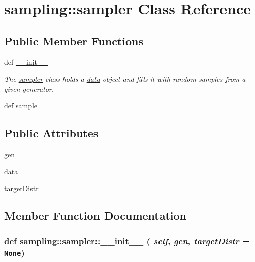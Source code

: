 \hypertarget{classsampling_1_1sampler}{
\section{sampling::sampler Class Reference}
\label{classsampling_1_1sampler}
}
\subsection*{Public Member Functions}
\begin{CompactItemize}
\item 
def \hyperlink{classsampling_1_1sampler_1f14a8e3d0700779dcdac79def1c33d3}{\_\-\_\-init\_\-\_\-}
\begin{CompactList}\small\item\em The \hyperlink{classsampling_1_1sampler}{sampler} class holds a \hyperlink{classsampling_1_1data}{data} object and fills it with random samples from a given generator. \item\end{CompactList}\item 
def \hyperlink{classsampling_1_1sampler_a3908666fdfd325eb00c171a267fe650}{sample}
\end{CompactItemize}
\subsection*{Public Attributes}
\begin{CompactItemize}
\item 
\hyperlink{classsampling_1_1sampler_96f11b07709c74778ddd41e8d7ea1439}{gen}
\item 
\hyperlink{classsampling_1_1sampler_ac2f0763c7a907e0968b96b6e440ab5a}{data}
\item 
\hyperlink{classsampling_1_1sampler_5a11056b435de5e46629d6517120bb98}{targetDistr}
\end{CompactItemize}


\subsection{Member Function Documentation}
\hypertarget{classsampling_1_1sampler_1f14a8e3d0700779dcdac79def1c33d3}{
\subsubsection[{\_\-\_\-init\_\-\_\-}]{\setlength{\rightskip}{0pt plus 5cm}def sampling::sampler::\_\-\_\-init\_\-\_\- ( {\em self}, \/   {\em gen}, \/   {\em targetDistr} = {\tt None})}}
\label{classsampling_1_1sampler_1f14a8e3d0700779dcdac79def1c33d3}


